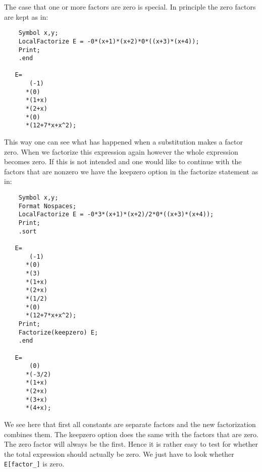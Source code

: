 \noindent The case that one or more factors are zero is special. In 
principle the zero factors are kept as in:
\begin{verbatim}
    Symbol x,y;
    LocalFactorize E = -0*(x+1)*(x+2)*0*((x+3)*(x+4));
    Print;
    .end

   E=
       (-1)
      *(0)
      *(1+x)
      *(2+x)
      *(0)
      *(12+7*x+x^2);
\end{verbatim}
\noindent This way one can see what has happened when a substitution makes 
a factor zero. When we factorize this expression again however the whole 
expression becomes zero. If this is not intended and one would like to 
continue with the factors that are nonzero we have the keepzero option in 
the factorize statement as in:
\begin{verbatim}
    Symbol x,y;
    Format Nospaces;
    LocalFactorize E = -0*3*(x+1)*(x+2)/2*0*((x+3)*(x+4));
    Print;
    .sort

   E=
       (-1)
      *(0)
      *(3)
      *(1+x)
      *(2+x)
      *(1/2)
      *(0)
      *(12+7*x+x^2);
    Print;
    Factorize(keepzero) E;
    .end

   E=
       (0)
      *(-3/2)
      *(1+x)
      *(2+x)
      *(3+x)
      *(4+x);
\end{verbatim}
\noindent We see here that first all constants are separate factors and the 
new factorization combines them. The keepzero option does the same with the 
factors that are zero. The zero factor will always be the first. Hence it 
is rather easy to test for whether the total expression should actually be 
zero. We just have to look whether \verb:E[factor_]: is zero.

